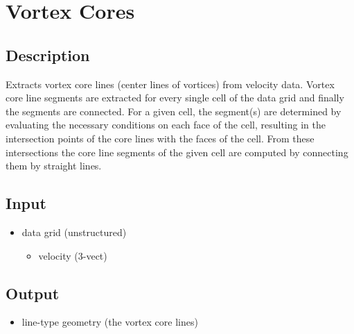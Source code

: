 \section{Vortex Cores}
\label{sec:vortex-cores}


\subsection{Description}
Extracts vortex core lines (center lines of vortices) from velocity data. Vortex core line segments are extracted for every single cell of the data grid and finally the segments are connected. For a given cell, the segment(s) are determined by evaluating the necessary conditions on each face of the cell, resulting in the intersection points of the core lines with the faces of the cell. From these intersections the core line segments of the given cell are computed by connecting them by straight lines.
 

\subsection{Input}
\begin{itemize}
\item
  data grid (unstructured)
  \begin{itemize}
  \item
    velocity (3-vect)
  \end{itemize}
\end{itemize}


\subsection{Output}
\begin{itemize}
\item
  line-type geometry (the vortex core lines)
\end{itemize}


